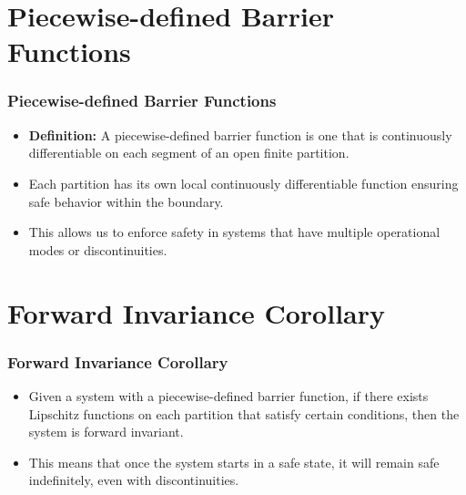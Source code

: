\documentclass[aspectratio=169,xcolor=dvipsnames]{beamer}
\begin{document}
\section{Piecewise-defined Barrier Functions}
\begin{frame}
    \frametitle{Piecewise-defined Barrier Functions}
    \begin{itemize}
        \item \textbf{Definition:} A piecewise-defined barrier function is one that is continuously differentiable on each segment of an open finite partition.
        \item Each partition has its own local continuously differentiable function ensuring safe behavior within the boundary.
        \item This allows us to enforce safety in systems that have multiple operational modes or discontinuities.
    \end{itemize}
\end{frame}

\section{Forward Invariance Corollary}
\begin{frame}
    \frametitle{Forward Invariance Corollary}
    \begin{itemize}
        \item Given a system with a piecewise-defined barrier function, if there exists Lipschitz functions on each partition that satisfy certain conditions, then the system is forward invariant.
        \item This means that once the system starts in a safe state, it will remain safe indefinitely, even with discontinuities.
    \end{itemize}
    \vfill
    \centering
\end{frame}

\end{document}
